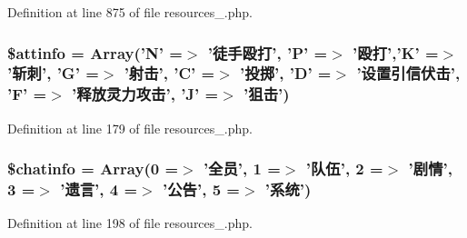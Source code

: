 Definition at line 875 of file resources\+\_.\+php.

\hypertarget{cache_2resources__1_8php_a92eb8a09b2b4554f7502c542f0cdf0d6}{
\subsubsection[{\$attinfo}]{\setlength{\rightskip}{0pt plus 5cm}\$attinfo = Array('N' =$>$ '徒手殴打', 'P' =$>$ '殴打','K' =$>$ '斩刺', 'G' =$>$ '射击', 'C' =$>$ '投掷', 'D' =$>$ '设置引信伏击', 'F' =$>$ '释放灵力攻击', 'J' =$>$ '狙击')}}\label{cache_2resources__1_8php_a92eb8a09b2b4554f7502c542f0cdf0d6}


Definition at line 179 of file resources\+\_.\+php.

\hypertarget{cache_2resources__1_8php_abcea2ccdba90758edbd052712f3b2cec}{
\subsubsection[{\$chatinfo}]{\setlength{\rightskip}{0pt plus 5cm}\$chatinfo = Array(0 =$>$ '全员', 1 =$>$ '队伍', 2 =$>$ '剧情', 3 =$>$ '遗言', 4 =$>$ '公告', 5 =$>$ '系统')}}\label{cache_2resources__1_8php_abcea2ccdba90758edbd052712f3b2cec}


Definition at line 198 of file resources\+\_.\+php.

